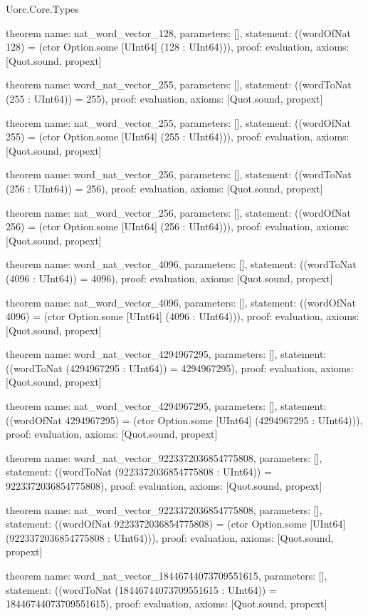 \begin{lexlean}{Uorc.Core.Types}
\begin{semanticmodule}
theorem{
  name: nat_word_vector_128,
  parameters: [],
  statement: ((wordOfNat 128) = (ctor Option.some [UInt64] (128 : UInt64))),
  proof: evaluation{},
  axioms: [Quot.sound, propext]
}

theorem{
  name: word_nat_vector_255,
  parameters: [],
  statement: ((wordToNat (255 : UInt64)) = 255),
  proof: evaluation{},
  axioms: [Quot.sound, propext]
}

theorem{
  name: nat_word_vector_255,
  parameters: [],
  statement: ((wordOfNat 255) = (ctor Option.some [UInt64] (255 : UInt64))),
  proof: evaluation{},
  axioms: [Quot.sound, propext]
}

theorem{
  name: word_nat_vector_256,
  parameters: [],
  statement: ((wordToNat (256 : UInt64)) = 256),
  proof: evaluation{},
  axioms: [Quot.sound, propext]
}

theorem{
  name: nat_word_vector_256,
  parameters: [],
  statement: ((wordOfNat 256) = (ctor Option.some [UInt64] (256 : UInt64))),
  proof: evaluation{},
  axioms: [Quot.sound, propext]
}

theorem{
  name: word_nat_vector_4096,
  parameters: [],
  statement: ((wordToNat (4096 : UInt64)) = 4096),
  proof: evaluation{},
  axioms: [Quot.sound, propext]
}

theorem{
  name: nat_word_vector_4096,
  parameters: [],
  statement: ((wordOfNat 4096) = (ctor Option.some [UInt64] (4096 : UInt64))),
  proof: evaluation{},
  axioms: [Quot.sound, propext]
}

theorem{
  name: word_nat_vector_4294967295,
  parameters: [],
  statement: ((wordToNat (4294967295 : UInt64)) = 4294967295),
  proof: evaluation{},
  axioms: [Quot.sound, propext]
}

theorem{
  name: nat_word_vector_4294967295,
  parameters: [],
  statement: ((wordOfNat 4294967295) = (ctor Option.some [UInt64] (4294967295 : UInt64))),
  proof: evaluation{},
  axioms: [Quot.sound, propext]
}

theorem{
  name: word_nat_vector_9223372036854775808,
  parameters: [],
  statement: ((wordToNat (9223372036854775808 : UInt64)) = 9223372036854775808),
  proof: evaluation{},
  axioms: [Quot.sound, propext]
}

theorem{
  name: nat_word_vector_9223372036854775808,
  parameters: [],
  statement: ((wordOfNat 9223372036854775808) = (ctor Option.some [UInt64] (9223372036854775808 : UInt64))),
  proof: evaluation{},
  axioms: [Quot.sound, propext]
}

theorem{
  name: word_nat_vector_18446744073709551615,
  parameters: [],
  statement: ((wordToNat (18446744073709551615 : UInt64)) = 18446744073709551615),
  proof: evaluation{},
  axioms: [Quot.sound, propext]
}


\end{semanticmodule}
\end{lexlean}
